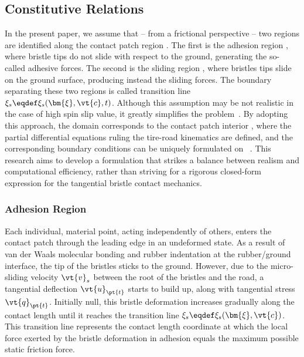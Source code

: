 
\subsection{Constitutive Relations}
\label{chap4:sec:constitutive_relations}

In the present paper, we assume that -- from a frictional perspective -- two regions are identified along the contact patch region \cp{}. The first is the adhesion region \adh{}, where bristle tips do not slide with respect to the ground, generating the so-called adhesive forces. The second is the sliding region \sli{}, where bristles tips slide on the ground surface, producing instead the sliding forces. The boundary separating these two regions is called transition line $\xi_s \eqdef \xi_s(\bm{\xi},\vt{c},t)$. Although this assumption may be not realistic in the case of high spin slip value, it greatly simplifies the problem~\cite{romano2022advanced}. By adopting this approach, the domain corresponds to the contact patch interior , where the partial differential equations ruling the tire-road kinematics are defined, and the corresponding boundary conditions can be uniquely formulated on ~\cite{romano2022analytical}. This research aims to develop a formulation that strikes a balance between realism and computational efficiency, rather than striving for a rigorous closed-form expression for the tangential bristle contact mechanics.

\subsubsection{Adhesion Region}

Each individual, material point, acting independently of others,  enters the contact patch through the leading edge in an undeformed state.  As a result of van der Waals molecular bonding
and rubber indentation
at the rubber/ground interface, the tip of the bristles sticks to the ground. However, due to the micro-sliding velocity $\vt{v}_s$ between the root of the bristles and the road, a tangential deflection $\vt{u}_{\pt{t}}$ starts to build up, along with tangential stress $\vt{q}_{\pt{t}}$. Initially null, this bristle deformation increases gradually along the contact length until it reaches the transition line $\xi_s \eqdef \xi_s(\bm{\xi},\vt{c})$. This transition line represents the contact length coordinate at which the local force exerted by the bristle deformation in adhesion equals the maximum possible static friction force.

